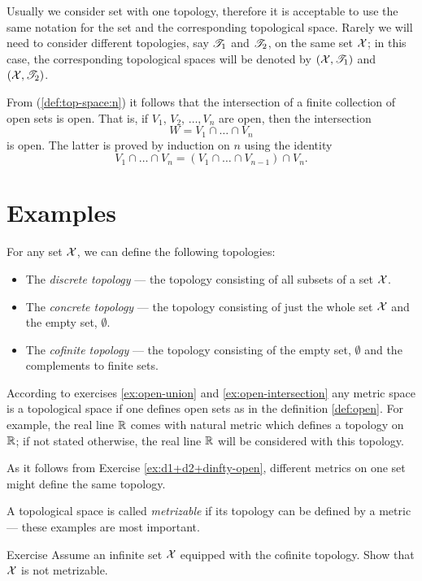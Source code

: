 Usually we consider set with one topology, therefore it is acceptable to use the same notation for the set and the corresponding topological space.
Rarely we will need to consider different topologies, say $\mathscr{T}_1$ and $\mathscr{T}_2$, on the same set $\mathcal{X}$;
in this case, the corresponding topological spaces will be denoted by $(\mathcal{X},\mathscr{T}_1)$ and $(\mathcal{X},\mathscr{T}_2)$.


From (\ref{def:top-space:n}) it follows that the intersection of a finite collection of open sets is open.
That is, if $V_1$, $V_2$, $\dots, V_n$ are open, then the intersection 
\[W=V_1 \cap \dots\cap V_n\] is open.
The latter is proved by induction on $n$ using the identity
\[V_1 \cap \dots\cap V_n=(V_1 \cap \dots \cap V_{n-1})\cap V_n.\]

\section{Examples}\label{sec:ecamples(top)}

For any set $\mathcal{X}$, we can define the following topologies:
\begin{itemize} 
\item  The \emph{discrete topology} --- the topology consisting of all subsets of a set $\mathcal{X}$.
\item  The \emph{concrete topology}  --- the topology consisting of just the whole set $\mathcal{X}$ and the empty set, $\emptyset$.
\item  The \emph{cofinite topology} --- the topology consisting of the empty set, $\emptyset$ and the complements to finite sets.
\end{itemize}

According to exercises \ref{ex:open-union} and \ref{ex:open-intersection} any metric space is a topological space if one defines open sets as in the definition \ref{def:open}.
For example, the real line $\mathbb{R}$ comes with natural metric which defines a topology on $\mathbb{R}$;
if not stated otherwise, the real line $\mathbb{R}$ will be considered with this topology.

As it follows from Exercise \ref{ex:d1+d2+dinfty-open},
different metrics on one set might define the same topology.

A topological space is called \emph{metrizable} if its topology can be defined by a metric --- these examples are most important.

\begin{thm}{Exercise}\label{ex:cofinite-metrizable}
Assume an infinite set $\mathcal{X}$ equipped with the cofinite topology.
Show that $\mathcal{X}$ is not metrizable.
\end{thm}

